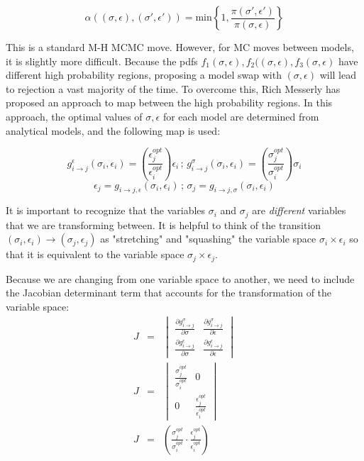 \documentclass[12pt]{minimal}
\begin{document}
\begin{equation}
\alpha((\sigma, \epsilon),(\sigma', \epsilon')) = \mathrm{min} \left \{ 1, \frac{\pi(\sigma', \epsilon')}{\pi(\sigma, \epsilon)} \right \}
\end{equation}


This is a standard M-H MCMC move.  However, for MC moves between models, it is slightly more difficult.  Because the pdfs $f_1(\sigma, \epsilon), f_2((\sigma, \epsilon),f_3(\sigma, \epsilon)$ have different high probability regions, proposing a model swap with $(\sigma, \epsilon)$ will lead to rejection a vast majority of the time. To overcome this, Rich Messerly has proposed an approach to map between the high probability regions.  In this approach, the optimal values of $\sigma, \epsilon$ for each model are determined from analytical models, and the following map is used:

\begin{equation}
g^{\epsilon}_{i\rightarrow j}(\sigma_i,\epsilon_i)=\left ( \frac{\epsilon^{opt}_j}{\epsilon^{opt}_i}\right ) \epsilon_i \, ; \, g^{\sigma}_{i\rightarrow j}(\sigma_i,\epsilon_i)=\left ( \frac{\sigma^{opt}_j}{\sigma^{opt}_i}\right ) \sigma_i
\end{equation}
\begin{equation}
\epsilon_j=g_{i\rightarrow j,\epsilon}(\sigma_i,\epsilon_i) \, ; \, \sigma_j=g_{i\rightarrow j,\sigma}(\sigma_i,\epsilon_i)
\end{equation}

It is important to recognize that the variables $\sigma_i$ and $\sigma_j$ are \emph{different} variables that we are transforming between.  It is helpful to think of the transition $(\sigma_i,\epsilon_i)\rightarrow (\sigma_j,\epsilon_j)$ as "stretching" and "squashing" the variable space $\sigma_i \times \epsilon_i$ so that it is equivalent to the variable space $\sigma_j \times \epsilon_j$.

Because we are changing from one variable space to another, we need to include the Jacobian determinant term that accounts for the transformation of the variable space:
\begin{eqnarray}
J & = & \begin{vmatrix}
\frac{\partial g^{\sigma}_{i\rightarrow j}}{\partial \sigma } & \frac{\partial g^{\sigma}_{i\rightarrow j}}{\partial \epsilon } \\ 
\frac{\partial g^{\epsilon}_{i\rightarrow j}}{\partial \sigma } & \frac{\partial g^{\epsilon}_{i\rightarrow j}}{\partial \epsilon }
\end{vmatrix}\\
J & = & \begin{vmatrix}
\frac{\sigma^{opt}_j}{\sigma^{opt}_i} & 0 \\ 
0 & \frac{\epsilon^{opt}_j}{\epsilon^{opt}_i}
\end{vmatrix}\\
J & = & \left (\frac{\sigma^{opt}_j}{\sigma^{opt}_i} \cdot \frac{\epsilon^{opt}_j}{\epsilon^{opt}_i} \right )
\end{eqnarray}
\end{document}
